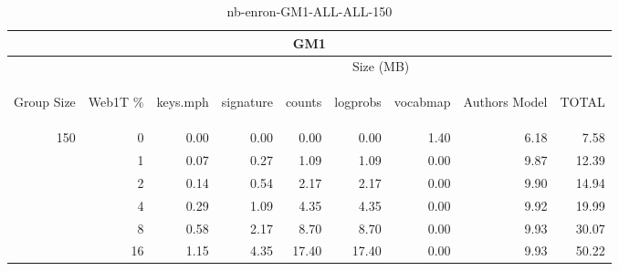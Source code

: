 \begin{center}
\begin{table}[htbp]
\begin{tabular}{ | r | r | r | r | r | r | r | r | r |}
\hline
\multicolumn{9}{|c|}{GM1}\\
\hline
 & & \multicolumn{7}{|c|}{Size (MB)}\\ \cline{3-9}
\begin{sideways}Group Size\end{sideways} & \begin{sideways}Web1T \% \end{sideways} & \begin{sideways}keys.mph\end{sideways} & \begin{sideways}signature\end{sideways} & \begin{sideways}counts\end{sideways} & \begin{sideways}logprobs\end{sideways} & \begin{sideways}vocabmap\end{sideways} & \begin{sideways}Authors Model \end{sideways} & \begin{sideways}TOTAL\end{sideways}\\
\hline
\multirow{5}{*}{150}
 & 0 & 0.00 & 0.00 & 0.00 & 0.00 & 1.40 & 6.18 & 7.58\\ \cline{2-9}
 & 1 & 0.07 & 0.27 & 1.09 & 1.09 & 0.00 & 9.87 & 12.39\\ \cline{2-9}
 & 2 & 0.14 & 0.54 & 2.17 & 2.17 & 0.00 & 9.90 & 14.94\\ \cline{2-9}
 & 4 & 0.29 & 1.09 & 4.35 & 4.35 & 0.00 & 9.92 & 19.99\\ \cline{2-9}
 & 8 & 0.58 & 2.17 & 8.70 & 8.70 & 0.00 & 9.93 & 30.07\\ \cline{2-9}
 & 16 & 1.15 & 4.35 & 17.40 & 17.40 & 0.00 & 9.93 & 50.22\\ \cline{2-9}
\hline
\end{tabular}
\caption{nb-enron-GM1-ALL-ALL-150}
\label{table:nb-enron-GM1-ALL-ALL-150}
\end{table}
\end{center}

